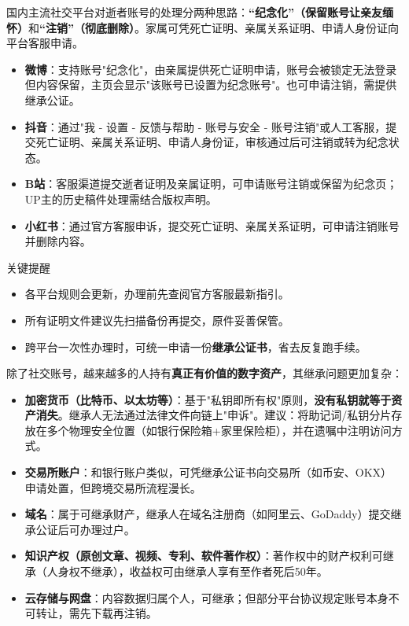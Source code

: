 
国内主流社交平台对逝者账号的处理分两种思路：\textbf{“纪念化”（保留账号让亲友缅怀）}和\textbf{“注销”（彻底删除）}。家属可凭死亡证明、亲属关系证明、申请人身份证向平台客服申请。

\begin{itemize}
  \item \textbf{微博}：支持账号"纪念化"，由亲属提供死亡证明申请，账号会被锁定无法登录但内容保留，主页会显示"该账号已设置为纪念账号"。也可申请注销，需提供继承公证。
  \item \textbf{抖音}：通过"我 - 设置 - 反馈与帮助 - 账号与安全 - 账号注销"或人工客服，提交死亡证明、亲属关系证明、申请人身份证，审核通过后可注销或转为纪念状态。
  \item \textbf{B站}：客服渠道提交逝者证明及亲属证明，可申请账号注销或保留为纪念页；UP主的历史稿件处理需结合版权声明。
  \item \textbf{小红书}：通过官方客服申诉，提交死亡证明、亲属关系证明，可申请注销账号并删除内容。
\end{itemize}

\begin{tcbinfo}{关键提醒}
\begin{itemize}
  \item 各平台规则会更新，办理前先查阅官方客服最新指引。
  \item 所有证明文件建议先扫描备份再提交，原件妥善保管。
  \item 跨平台一次性办理时，可统一申请一份\textbf{继承公证书}，省去反复跑手续。
\end{itemize}

\end{tcbinfo}


除了社交账号，越来越多的人持有\textbf{真正有价值的数字资产}，其继承问题更加复杂：

\begin{itemize}
  \item \textbf{加密货币（比特币、以太坊等）}：基于"私钥即所有权"原则，\textbf{没有私钥就等于资产消失}。继承人无法通过法律文件向链上"申诉"。建议：将助记词/私钥分片存放在多个物理安全位置（如银行保险箱+家里保险柜），并在遗嘱中注明访问方式。
  \item \textbf{交易所账户}：和银行账户类似，可凭继承公证书向交易所（如币安、OKX）申请处置，但跨境交易所流程漫长。
  \item \textbf{域名}：属于可继承财产，继承人在域名注册商（如阿里云、GoDaddy）提交继承公证后可办理过户。
  \item \textbf{知识产权（原创文章、视频、专利、软件著作权）}：著作权中的财产权利可继承（人身权不继承），收益权可由继承人享有至作者死后50年。
  \item \textbf{云存储与网盘}：内容数据归属个人，可继承；但部分平台协议规定账号本身不可转让，需先下载再注销。
\end{itemize}

